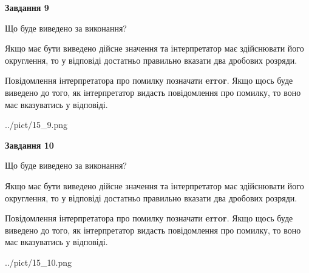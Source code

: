 \documentclass[12pt, ukrainian]{article}
\begin{document}
{\begin {Large}
{\begin {center}\textbf{Завдання 9}\end {center}}\par
Що буде виведено за виконання? \par

Якщо має бути виведено дійсне значення та інтерпретатор має здійснювати його округлення, 
то у відповіді достатньо правильно вказати два дробових розряди.

Повідомлення інтерпретатора про помилку позначати \textbf{error}.
Якщо щось буде виведено до того, як інтерпретатор видасть повідомлення про помилку, 
то воно має вказуватись у відповіді. \par

\begin{center}
	{../pict/15_9.png}
\end{center}
\newpage

{\begin {center}\textbf{Завдання 10}\end {center}}\par
Що буде виведено за виконання? \par

Якщо має бути виведено дійсне значення та інтерпретатор має здійснювати його округлення, 
то у відповіді достатньо правильно вказати два дробових розряди.

Повідомлення інтерпретатора про помилку позначати \textbf{error}.
Якщо щось буде виведено до того, як інтерпретатор видасть повідомлення про помилку, 
то воно має вказуватись у відповіді. \par

\begin{center}
	{../pict/15_10.png}
\end{center}
\newpage

\end {Large}}
\end{document}
